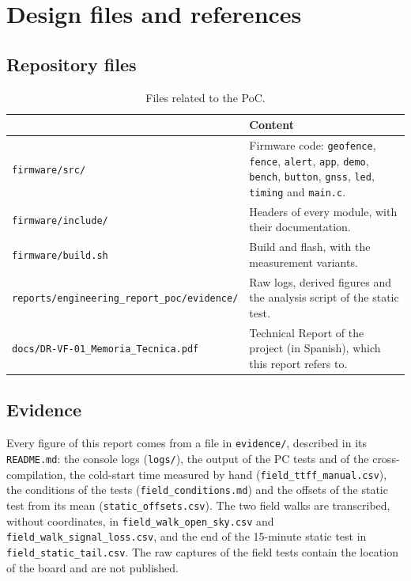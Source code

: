 \section{Design files and references}

\subsection{Repository files}

\begin{table}[H]
\centering
\small
\begin{tabularx}{\textwidth}{|l X|}
\hline
\tablehead{\textbf{Path} & \textbf{Content}} \\ \hline
\texttt{firmware/src/} & Firmware code: \texttt{geofence}, \texttt{fence}, \texttt{alert}, \texttt{app}, \texttt{demo}, \texttt{bench}, \texttt{button}, \texttt{gnss}, \texttt{led}, \texttt{timing} and \texttt{main.c}. \\ \hline
\texttt{firmware/include/} & Headers of every module, with their documentation. \\ \hline
\texttt{firmware/build.sh} & Build and flash, with the measurement variants. \\ \hline
\texttt{reports/engineering\_report\_poc/evidence/} & Raw logs, derived figures and the analysis script of the static test. \\ \hline
\texttt{docs/DR-VF-01\_Memoria\_Tecnica.pdf} & Technical Report of the project (in Spanish), which this report refers to. \\ \hline
\end{tabularx}
\caption{Files related to the PoC.}
\end{table}

\subsection{Evidence}

Every figure of this report comes from a file in \texttt{evidence/}, described in its \texttt{README.md}: the
console logs (\texttt{logs/}), the output of the PC tests and of the cross-compilation, the cold-start time
measured by hand (\texttt{field\_ttff\_manual.csv}), the conditions of the tests
(\texttt{field\_conditions.md}) and the offsets of the static test from its mean
(\texttt{static\_offsets.csv}). The two field walks are transcribed, without coordinates, in
\texttt{field\_walk\_open\_sky.csv} and \texttt{field\_walk\_signal\_loss.csv}, and the end of the 15-minute static test in
\texttt{field\_static\_tail.csv}. The raw captures of the field tests contain the location of the board and are
not published.


